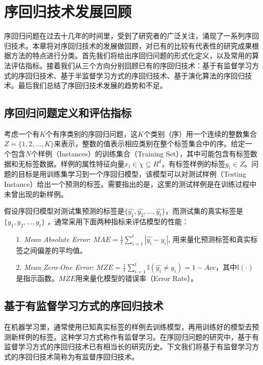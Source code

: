 \chapter{序回归技术发展回顾}
\label{chap:review}

序回归问题在过去十几年的时间里，受到了研究者的广泛关注，涌现了一系列序回归技术。本章将对序回归技术的发展做回顾，对已有的比较有代表性的研究成果根据方法的特点进行分类。首先我们将给出序回归问题的形式化定义，以及常用的算法评估指标。接着我们从三个方向分别回顾已有的序回归技术：基于有监督学习方式的序回归技术、基于半监督学习方式的序回归技术、基于演化算法的序回归技术。最后我们总结了序回归技术发展的趋势和不足。

\section{序回归问题定义和评估指标}
考虑一个有\(K\)个有序类别的序回归问题，这\(K\)个类别（序）用一个连续的整数集合 \(Z=\{1,2,\dots,K\}\)来表示，整数的值表示相应类别在整个标签集合中的序。给定一个包含\(N\)个样例（Instances）的训练集合（Training Set），其中可能包含有标签数据和无标签数据。样例的属性特征向量\(x_{i} \in \chi \subseteq R^{d}\)，有标签样例的标签\(y_{i} \in Z\)。问题的目标是用训练集学习到一个序回归模型，该模型可以对测试样例（Testing Instance）给出一个预测的标签。需要指出的是，这里的测试样例是在训练过程中未曾出现的新样例。


假设序回归模型对测试集预测的标签是\(\{\hat{y_{1}},\hat{y_{2}},\dots,\hat{y_{t}}\}\)，而测试集的真实标签是 \(\{y_{1},y_{2},\dots,y_{t}\}\) ，通常采用下面两种指标来评估模型的性能：
\begin{enumerate}
\item[1.] \textit{Mean Absolute Error}: \(MAE=\frac{1}{t}\sum_{i=1}^{t}|\hat{y_{i}}-y_{i}|\), 用来量化预测标签和真实标签之间偏差的平均值。
\item[2.] \textit{Mean Zero-One Error}: \(MZE=\frac{1}{t}\sum_{i=1}^{t}\mathbb{I}(\hat{y_{i}}\neq y_{i}) = 1-Acc\)，其中\(\mathbb{I}(\cdot)\)是指示函数。\(MZE\)用来量化模型的错误率（Error Rate）。
\end{enumerate}

\section{基于有监督学习方式的序回归技术}
在机器学习里，通常使用已知真实标签的样例去训练模型，再用训练好的模型去预测新样例的标签。这种学习方式称作有监督学习。在序回归问题的研究中，基于有监督学习方式的序回归技术已有相当长的研究历史。下文我们将基于有监督学习方式的序回归技术简称为有监督序回归技术。

